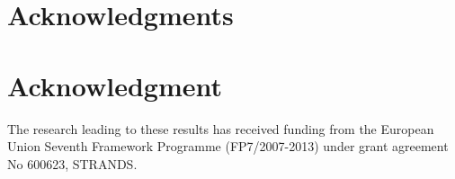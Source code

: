 \ifCLASSOPTIONcompsoc
  \section*{Acknowledgments}

\else
  \section*{Acknowledgment}
\fi

The research leading to these results has received funding from the European Union Seventh Framework Programme (FP7/2007-2013) under grant agreement No 600623, STRANDS.
